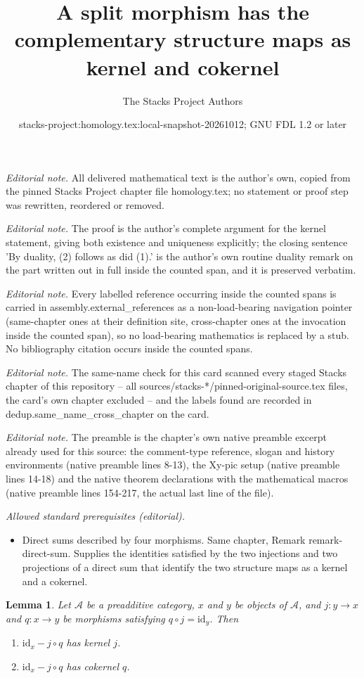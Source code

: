 \documentclass[10pt,a4paper]{amsart}
\title{A split morphism has the complementary structure maps as kernel and cokernel}
\author{The Stacks Project Authors}
\date{stacks-project:homology.tex:local-snapshot-20261012; GNU FDL 1.2 or later}
\theoremstyle{plain}
\newtheorem{lemma}[subsection]{Lemma}
\theoremstyle{definition}
\theoremstyle{remark}
\numberwithin{equation}{subsection}
\begin{document}
\maketitle
\noindent\textit{Editorial note.} All delivered mathematical text is the author's own, copied from the pinned Stacks Project chapter file homology.tex; no statement or proof step was rewritten, reordered or removed.\par\medskip
\noindent\textit{Editorial note.} The proof is the author's complete argument for the kernel statement, giving both existence and uniqueness explicitly; the closing sentence 'By duality, (2) follows as did (1).' is the author's own routine duality remark on the part written out in full inside the counted span, and it is preserved verbatim.\par\medskip
\noindent\textit{Editorial note.} Every labelled reference occurring inside the counted spans is carried in assembly.external\_references as a non-load-bearing navigation pointer (same-chapter ones at their definition site, cross-chapter ones at the invocation inside the counted span), so no load-bearing mathematics is replaced by a stub. No bibliography citation occurs inside the counted spans.\par\medskip
\noindent\textit{Editorial note.} The same-name check for this card scanned every staged Stacks chapter of this repository -- all sources/stacks-*/pinned-original-source.tex files, the card's own chapter excluded -- and the labels found are recorded in dedup.same\_name\_cross\_chapter on the card.\par\medskip
\noindent\textit{Editorial note.} The preamble is the chapter's own native preamble excerpt already used for this source: the comment-type reference, slogan and history environments (native preamble lines 8-13), the Xy-pic setup (native preamble lines 14-18) and the native theorem declarations with the mathematical macros (native preamble lines 154-217, the actual last line of the file).\par\medskip
\noindent\textit{Allowed standard prerequisites (editorial).}\begin{itemize}
\item Direct sums described by four morphisms. Same chapter, Remark remark-direct-sum. Supplies the identities satisfied by the two injections and two projections of a direct sum that identify the two structure maps as a kernel and a cokernel.
\end{itemize}\medskip
\begin{lemma}
\label{lemma-split-morphism-kernel-cokernel}
Let $\mathcal{A}$ be a preadditive category,
$x$ and $y$ be objects of $\mathcal{A}$,
and $j : y \to x$ and $q : x \to y$ be morphisms
satisfying $q \circ j = \text{id} _ y$.
Then
\begin{enumerate}
\item $\text{id} _ x - j \circ q$ has kernel $j$.
\item $\text{id} _ x - j \circ q$ has cokernel $q$.
\end{enumerate}
\end{lemma}
\end{document}
